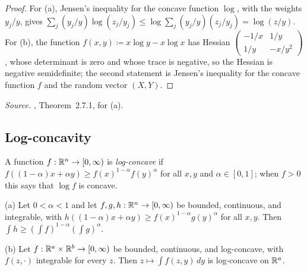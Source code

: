 \begin{proof}
For (a), Jensen's inequality for the concave function \(\log\), with the
weights \(y_j/y\), gives \(\sum_j(y_j/y)\log(z_j/y_j)\le\log\sum_j(y_j/y)(z_j/y_j)
=\log(z/y)\). For (b), the function \(f(x,y)\coloneqq x\log y-x\log x\) has Hessian
\(\begin{pmatrix}-1/x&1/y\\1/y&-x/y^2\end{pmatrix}\), whose determinant is
zero and whose trace is negative, so the Hessian is negative semidefinite;
the second statement is Jensen's inequality for the concave function
\(f\) and the random vector \((X,Y)\).
\end{proof}

\emph{Source.} , Theorem~2.7.1, for (a).

\subsection{Log-concavity}\label{tb:sec:logconcave}

A function \(f:\mathbb R^n\to[0,\infty)\) is \emph{log-concave} if
\(f((1-\alpha)x+\alpha y)\ge f(x)^{1-\alpha}f(y)^\alpha\) for all \(x,y\) and \(\alpha\in[0,1]\);
when \(f>0\) this says that \(\log f\) is concave.

\begin{fact}
\label{tb:prekopa}
(a) Let \(0<\alpha<1\) and let \(f,g,h:\mathbb R^n\to[0,\infty)\) be bounded,
continuous, and integrable, with
\(h((1-\alpha)x+\alpha y)\ge f(x)^{1-\alpha}g(y)^\alpha\) for all \(x,y\). Then
\(\int h\ge(\int f)^{1-\alpha}(\int g)^\alpha\).

(b) Let \(f:\mathbb R^a\times\mathbb R^b\to[0,\infty)\) be bounded, continuous, and
log-concave, with \(f(z,\cdot)\) integrable for every \(z\). Then
\(z\mapsto\int f(z,y)\,dy\) is log-concave on \(\mathbb R^a\).
\end{fact}

